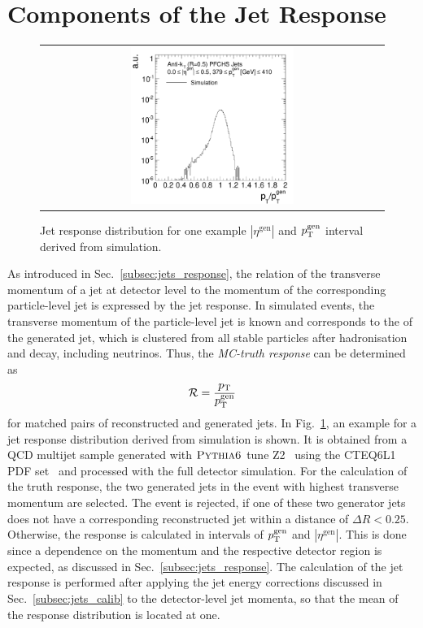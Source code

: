 \section{Components of the Jet Response}
\label{sec:jer_response}
\begin{figure}[!tp]
  \centering
  \begin{tabular}{c}
                \includegraphics[width=0.49\textwidth]{figures/TruthResponse_example_test.pdf}
  \end{tabular}
  \caption{Jet response distribution for one example $|\eta^\mathrm{gen}|$ and $p_{\text{T}}^\mathrm{gen}$ interval derived from simulation.}
  \label{fig:response}
\end{figure}
As introduced in Sec.~\ref{subsec:jets_response}, the relation of the transverse momentum of a jet at detector level to the momentum of the corresponding particle-level jet is expressed by the jet response. In simulated events, the transverse momentum of the particle-level jet is known and corresponds to the \pt of the generated jet, which is clustered from all stable particles after hadronisation and decay, including neutrinos. Thus, the \textit{MC-truth response} can be determined as
\begin{equation}
\mathcal{R} = \frac{p_{\text{T}}}{p_{\text{T}}^{\mathrm{gen}}} 
\end{equation}
for matched pairs of reconstructed and generated jets. In Fig.~\ref{fig:response}, an example for a jet response distribution derived from simulation is shown. It is obtained from a QCD multijet sample generated with $\textsc{Pythia6}$ tune Z2~\cite{Chatrchyan:2011id} using the CTEQ6L1 PDF set~\cite{Pumplin:2002vw} and processed with the full detector simulation. For the calculation of the truth response, the two generated jets in the event with highest transverse momentum are selected. The event is rejected, if one of these two generator jets does not have a corresponding reconstructed jet within a distance of $\Delta R < 0.25$. Otherwise, the response is calculated in intervals of $p_{\text{T}}^\mathrm{gen}$ and $|\eta^\mathrm{gen}|$. This is done since a dependence on the momentum and the respective detector region is expected, as discussed in Sec.~\ref{subsec:jets_response}. The calculation of the jet response is performed after applying the jet energy corrections discussed in Sec.~\ref{subsec:jets_calib} to the detector-level jet momenta, so that the mean of the response distribution is located at one. \\
